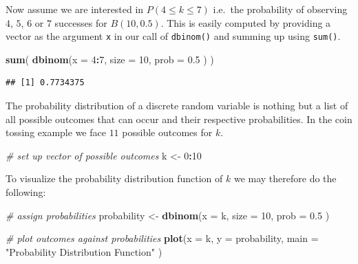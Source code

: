 \documentclass[]{book}
\newenvironment{Shaded}{\begin{snugshade}}{\end{snugshade}}
\newcommand{\KeywordTok}[1]{\textcolor[rgb]{0.13,0.29,0.53}{\textbf{#1}}}
\newcommand{\DataTypeTok}[1]{\textcolor[rgb]{0.13,0.29,0.53}{#1}}
\newcommand{\DecValTok}[1]{\textcolor[rgb]{0.00,0.00,0.81}{#1}}
\newcommand{\FloatTok}[1]{\textcolor[rgb]{0.00,0.00,0.81}{#1}}
\newcommand{\StringTok}[1]{\textcolor[rgb]{0.31,0.60,0.02}{#1}}
\newcommand{\CommentTok}[1]{\textcolor[rgb]{0.56,0.35,0.01}{\textit{#1}}}
\newcommand{\OperatorTok}[1]{\textcolor[rgb]{0.81,0.36,0.00}{\textbf{#1}}}
\newcommand{\NormalTok}[1]{#1}
\theoremstyle{definition}
\theoremstyle{definition}
\theoremstyle{definition}
\theoremstyle{remark}
\begin{document}
Now assume we are interested in \(P(4 \leq k \leq 7)\) i.e.~the
probability of observing \(4\), \(5\), \(6\) or \(7\) successes for
\(B(10,0.5)\). This is easily computed by providing a vector as the
argument \texttt{x} in our call of \texttt{dbinom()} and summing up
using \texttt{sum()}.

\begin{Shaded}
\begin{Highlighting}[]
\KeywordTok{sum}\NormalTok{(}
  \KeywordTok{dbinom}\NormalTok{(}\DataTypeTok{x =} \DecValTok{4}\OperatorTok{:}\DecValTok{7}\NormalTok{, }
         \DataTypeTok{size =} \DecValTok{10}\NormalTok{, }
         \DataTypeTok{prob =} \FloatTok{0.5}
\NormalTok{         )}
\NormalTok{  )}
\end{Highlighting}
\end{Shaded}

\begin{verbatim}
## [1] 0.7734375
\end{verbatim}

The probability distribution of a discrete random variable is nothing
but a list of all possible outcomes that can occur and their respective
probabilities. In the coin tossing example we face \(11\) possible
outcomes for \(k\).

\begin{Shaded}
\begin{Highlighting}[]
\CommentTok{# set up vector of possible outcomes}
\NormalTok{k <-}\StringTok{ }\DecValTok{0}\OperatorTok{:}\DecValTok{10}
\end{Highlighting}
\end{Shaded}

To visualize the probability distribution function of \(k\) we may
therefore do the following:

\begin{Shaded}
\begin{Highlighting}[]
\CommentTok{# assign probabilities}
\NormalTok{probability <-}\StringTok{ }\KeywordTok{dbinom}\NormalTok{(}\DataTypeTok{x =}\NormalTok{ k,}
                      \DataTypeTok{size =} \DecValTok{10}\NormalTok{, }
                      \DataTypeTok{prob =} \FloatTok{0.5}
\NormalTok{                      )}

\CommentTok{# plot outcomes against probabilities}
\KeywordTok{plot}\NormalTok{(}\DataTypeTok{x =}\NormalTok{ k, }
     \DataTypeTok{y =}\NormalTok{ probability,}
     \DataTypeTok{main =} \StringTok{"Probability Distribution Function"}
\NormalTok{     ) }
\end{Highlighting}
\end{Shaded}
\end{document}
